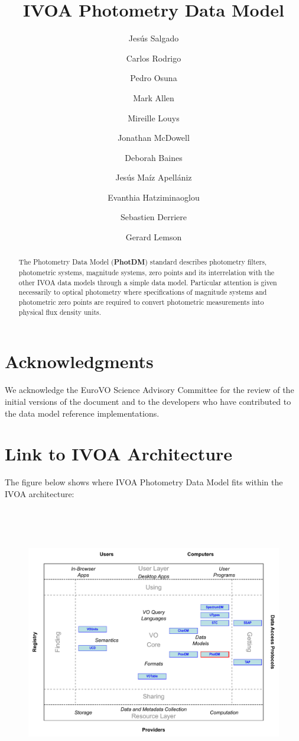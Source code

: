 \documentclass[11pt,a4paper]{ivoa}
\title{IVOA Photometry Data Model}
\author{Jesús Salgado}
\author{Carlos Rodrigo}
\author{Pedro Osuna}
\author{Mark Allen}
\author{Mireille Louys}
\author{Jonathan McDowell}
\author{Deborah Baines}
\author{Jesús Maíz Apellániz}
\author{Evanthia Hatziminaoglou}
\author{Sebastien Derriere}
\author{Gerard Lemson}
\begin{document}
\begin{abstract}
The Photometry Data Model (\textbf{PhotDM}) standard describes photometry filters, photometric systems, magnitude systems, zero points and its interrelation with the other IVOA data models through a simple data model. Particular attention is given necessarily to optical photometry where specifications of magnitude systems and photometric zero points are required to convert photometric measurements into physical flux density units.
\end{abstract}

\section*{Acknowledgments}
We acknowledge the EuroVO Science Advisory Committee for the review of the initial versions of the document and to the developers who have contributed to the data model reference implementations.

\section*{Link to IVOA Architecture}
The figure below shows where IVOA Photometry Data Model fits within the IVOA architecture:



\begin{figure}[H]
\advance\leftskip 0.0in		\includegraphics[width=6.0in,height=4.73in]{./role_diagram.pdf}
\end{figure}
\end{document}
